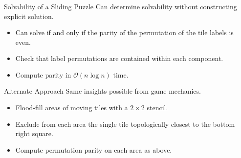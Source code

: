 \begin{frame}
    \frametitle{\problemtitle}
    \begin{block}{Solvability of a Sliding Puzzle}
      Can determine solvability without constructing explicit solution.
      \begin{itemize}
        \item Can solve if and only if the parity of the permutation
            of the tile labels is even.
        \item Check that label permutations are contained within each component.
        \item Compute parity in $\mathcal{O}(n\log n)$ time.
      \end{itemize}
    \end{block}
    \pause
    \begin{block}{Alternate Approach}
        Same insights possible from game mechanics.
        \begin{itemize}
          \item Flood-fill areas of moving tiles with a $2\times 2$ stencil.
          \item Exclude from each area the single tile topologically closest
              to the bottom right square.
          \item Compute permutation parity on each area as above.
        \end{itemize}
    \end{block}
    \pause
    \solvestats
\end{frame}

